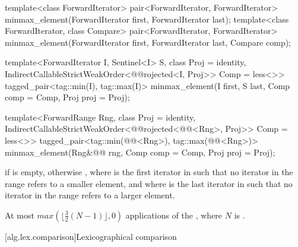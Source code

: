 %
\begin{removedblock}
\begin{itemdecl}
template<class ForwardIterator>
  pair<ForwardIterator, ForwardIterator>
    minmax_element(ForwardIterator first, ForwardIterator last);
template<class ForwardIterator, class Compare>
  pair<ForwardIterator, ForwardIterator>
    minmax_element(ForwardIterator first, ForwardIterator last, Compare comp);
\end{itemdecl}
\end{removedblock}
\begin{addedblock}
\begin{itemdecl}
template<ForwardIterator I, Sentinel<I> S, class Proj = identity,
    IndirectCallableStrictWeakOrder<@@rojected<I, Proj>> Comp = less<>>
  tagged_pair<tag::min(I), tag::max(I)>
    minmax_element(I first, S last, Comp comp = Comp{}, Proj proj = Proj{});

template<ForwardRange Rng, class Proj = identity,
    IndirectCallableStrictWeakOrder<@@rojected<@@<Rng>, Proj>> Comp = less<>>
  tagged_pair<tag::min(@@<Rng>),
              tag::max(@@<Rng>)>
    minmax_element(Rng&@\newtxt{\&}@ rng, Comp comp = Comp{}, Proj proj = Proj{});
\end{itemdecl}
\end{addedblock}

\begin{itemdescr}
\pnum
\returns
{} if  is empty, otherwise
, where  is
the first iterator in  such that no iterator in the range refers to a smaller
element, and where  is the last iterator in  such that no iterator
in the range refers to a larger element.

\pnum
\complexity
At most
$max(\lfloor{\frac{3}{2}} (N-1)\rfloor, 0)$
applications of the ,
where $N$ is .
\end{itemdescr}

[alg.lex.comparison]{Lexicographical comparison}

